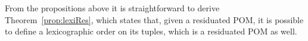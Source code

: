 \documentclass[a4paper]{elsarticle}
\newtheorem{remark}{Remark}
\newcommand{\1}{\mathbf{1}}
\def\odiv{{ \ominus\hspace{-8pt}:}\;}
\begin{document}
%

From the propositions above it is straightforward to derive Theorem~\ref{prop:lexiRes}, 
which states that, given a residuated POM, it is possible to define a lexicographic 
order on its tuples, which is a residuated POM as well. 
\end{document}
